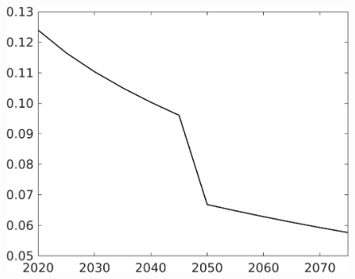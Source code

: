 \documentclass[12pt]{article}
\begin{document}
\begin{figure}[h!!]
\begin{minipage}[]{0.32\textwidth}
	\end{minipage}		
	\begin{minipage}[]{0.32\textwidth}
		\includegraphics[width=1\textwidth]{../../codding_model/own_basedOnFried/optimalPol_010922_revision/figures/all_13Sept22/CompTaufPER_bytaul_Reg0_EY_spillover0_nsk1_xgr0_knspil0_sep1_LFlimit1_emsbase0_countec0_GovRev0_etaa0.79_lgd0.png}
	\end{minipage}	
\end{figure}
\end{document}
